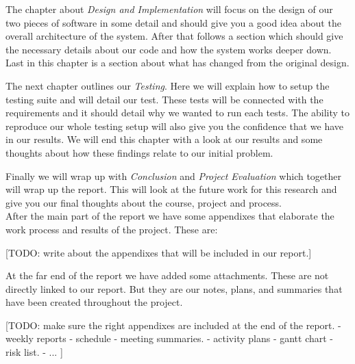     The chapter about \emph{Design and Implementation} will focus on the design of our two pieces of software in some detail and should give you a good idea about the overall architecture of the system. After that follows a section which should give the necessary details about our code and how the system works deeper down. Last in this chapter is a section about what has changed from the original design.
    
    The next chapter outlines our \emph{Testing}. Here we will explain how to setup the testing suite and will detail our test. These tests will be connected with the requirements and it should detail why we wanted to run each tests. The ability to reproduce our whole testing setup will also give you the confidence that we have in our results. We will end this chapter with a look at our results and some thoughts about how these findings relate to our initial problem.
    
    Finally we will wrap up with \emph{Conclusion} and \emph{Project Evaluation} which together will wrap up the report. This will look at the future work for this research and give you our final thoughts about the course, project and process.
    \\
    
    After the main part of the report we have some appendixes that elaborate the work process and results of the project. These are: 
    
    [TODO: write about the appendixes that will be included in our report.]
    
    At the far end of the report we have added some attachments. These are not directly linked to our report. But they are our notes, plans, and summaries that have been created throughout the project. 
    
    [TODO: make sure the right appendixes are included at the end of the report.
    - weekly reports
    - schedule
    - meeting summaries. 
    - activity plans
    - gantt chart
    - risk list. 
    - ...
    ]\\
    
